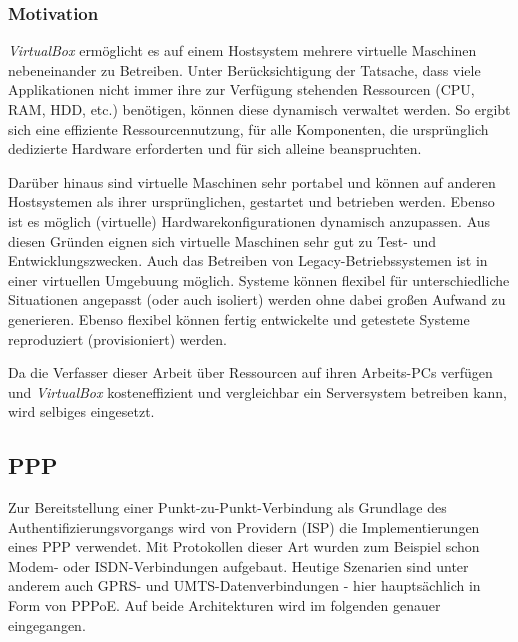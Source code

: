 \subsubsection{Motivation}
\textit{VirtualBox} ermöglicht es auf einem Hostsystem mehrere virtuelle Maschinen nebeneinander
zu Betreiben. Unter Berücksichtigung der Tatsache, dass viele Applikationen nicht immer ihre
zur Verfügung stehenden Ressourcen (CPU, RAM, HDD, etc.) benötigen, können diese dynamisch verwaltet
werden. So ergibt sich eine effiziente Ressourcennutzung, für alle Komponenten, die ursprünglich
dedizierte Hardware erforderten und für sich alleine beanspruchten.

Darüber hinaus sind virtuelle Maschinen sehr portabel und können auf anderen Hostsystemen als
ihrer ursprünglichen, gestartet und betrieben werden. Ebenso ist es möglich (virtuelle)
Hardwarekonfigurationen dynamisch anzupassen. Aus diesen Gründen eignen sich virtuelle
Maschinen sehr gut zu Test- und Entwicklungszwecken. Auch das Betreiben von Legacy-Betriebssystemen
ist in einer virtuellen Umgebuung möglich. Systeme können flexibel für unterschiedliche
Situationen angepasst (oder auch isoliert) werden ohne dabei großen Aufwand zu generieren.
Ebenso flexibel können fertig entwickelte und getestete Systeme reproduziert (provisioniert) werden.

Da die Verfasser dieser Arbeit über Ressourcen auf ihren Arbeits-PCs verfügen und \textit{VirtualBox}
kosteneffizient und vergleichbar ein Serversystem betreiben kann, wird selbiges eingesetzt.

\subsection{PPP}
Zur Bereitstellung einer Punkt-zu-Punkt-Verbindung als Grundlage des Authentifizierungsvorgangs
wird von Providern (\ac{ISP}) die Implementierungen eines
\ac{PPP} verwendet. Mit Protokollen dieser Art wurden zum Beispiel schon Modem- oder ISDN-Verbindungen
aufgebaut. Heutige Szenarien sind unter anderem auch GPRS- und UMTS-Datenverbindungen -
hier hauptsächlich in
Form von \ac{PPPoE}. Auf beide Architekturen wird im folgenden
genauer eingegangen.

